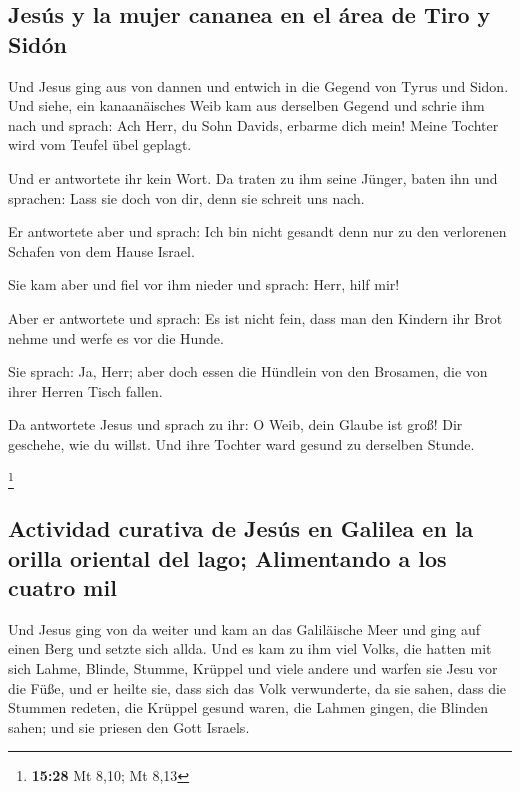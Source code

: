 \hypertarget{jesuxfas-y-la-mujer-cananea-en-el-uxe1rea-de-tiro-y-siduxf3n}{%
\subsection{Jesús y la mujer cananea en el área de Tiro y
Sidón}\label{jesuxfas-y-la-mujer-cananea-en-el-uxe1rea-de-tiro-y-siduxf3n}}

 Und Jesus ging aus von dannen und entwich in die Gegend
von Tyrus und Sidon.  Und siehe, ein kanaanäisches Weib
kam aus derselben Gegend und schrie ihm nach und sprach: Ach Herr, du
Sohn Davids, erbarme dich mein! Meine Tochter wird vom Teufel übel
geplagt.

 Und er antwortete ihr kein Wort. Da traten zu ihm seine
Jünger, baten ihn und sprachen: Lass sie doch von dir, denn sie schreit
uns nach.

 Er antwortete aber und sprach: Ich bin nicht gesandt
denn nur zu den verlorenen Schafen von dem Hause Israel.

 Sie kam aber und fiel vor ihm nieder und sprach: Herr,
hilf mir!

 Aber er antwortete und sprach: Es ist nicht fein, dass
man den Kindern ihr Brot nehme und werfe es vor die Hunde.

 Sie sprach: Ja, Herr; aber doch essen die Hündlein von
den Brosamen, die von ihrer Herren Tisch fallen.

 Da antwortete Jesus und sprach zu ihr: O Weib, dein
Glaube ist groß! Dir geschehe, wie du willst. Und ihre Tochter ward
gesund zu derselben Stunde.

\footnote{\textbf{15:28} Mt 8,10; Mt 8,13}

\hypertarget{actividad-curativa-de-jesuxfas-en-galilea-en-la-orilla-oriental-del-lago-alimentando-a-los-cuatro-mil}{%
\subsection{Actividad curativa de Jesús en Galilea en la orilla oriental
del lago; Alimentando a los cuatro
mil}\label{actividad-curativa-de-jesuxfas-en-galilea-en-la-orilla-oriental-del-lago-alimentando-a-los-cuatro-mil}}

 Und Jesus ging von da weiter und kam an das Galiläische
Meer und ging auf einen Berg und setzte sich allda.  Und
es kam zu ihm viel Volks, die hatten mit sich Lahme, Blinde, Stumme,
Krüppel und viele andere und warfen sie Jesu vor die Füße, und er heilte
sie,  dass sich das Volk verwunderte, da sie sahen, dass
die Stummen redeten, die Krüppel gesund waren, die Lahmen gingen, die
Blinden sahen; und sie priesen den Gott Israels.

